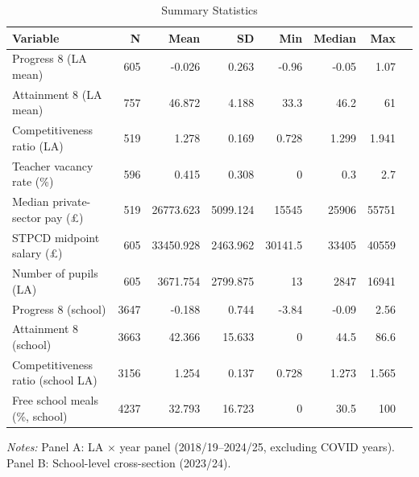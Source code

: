\begin{table}[htbp]
\centering
\caption{Summary Statistics}
\label{tab:summary}
\begin{tabular}{lrrrrrrr}
\toprule
Variable & N & Mean & SD & Min & Median & Max \\
\midrule
Progress 8 (LA mean) & 605 & -0.026 & 0.263 & -0.96 & -0.05 & 1.07 \\
Attainment 8 (LA mean) & 757 & 46.872 & 4.188 & 33.3 & 46.2 & 61 \\
Competitiveness ratio (LA) & 519 & 1.278 & 0.169 & 0.728 & 1.299 & 1.941 \\
Teacher vacancy rate (\%) & 596 & 0.415 & 0.308 & 0 & 0.3 & 2.7 \\
Median private-sector pay (\pounds) & 519 & 26773.623 & 5099.124 & 15545 & 25906 & 55751 \\
STPCD midpoint salary (\pounds) & 605 & 33450.928 & 2463.962 & 30141.5 & 33405 & 40559 \\
Number of pupils (LA) & 605 & 3671.754 & 2799.875 & 13 & 2847 & 16941 \\
Progress 8 (school) & 3647 & -0.188 & 0.744 & -3.84 & -0.09 & 2.56 \\
Attainment 8 (school) & 3663 & 42.366 & 15.633 & 0 & 44.5 & 86.6 \\
Competitiveness ratio (school LA) & 3156 & 1.254 & 0.137 & 0.728 & 1.273 & 1.565 \\
Free school meals (\%, school) & 4237 & 32.793 & 16.723 & 0 & 30.5 & 100 \\
\bottomrule
\end{tabular}
\begin{tablenotes}[flushleft]
\small
\item \textit{Notes:} Panel A: LA $\times$ year panel (2018/19--2024/25, excluding COVID years). Panel B: School-level cross-section (2023/24).
\end{tablenotes}
\end{table}

